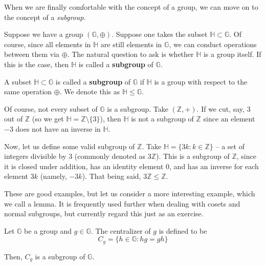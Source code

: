 \documentclass[../lecture-notes.tex]{subfiles}
\begin{document}
When we are finally comfortable with the concept of a group, we can move on to the concept of a \textit{subgroup}. 

Suppose we have a group $(\mathbb{G},\oplus)$. Suppose one takes the subset $\mathbb{H} \subset \mathbb{G}$. Of course, since all elements in $\mathbb{H}$ are still elements in $\mathbb{G}$, we can conduct operations between them via $\oplus$. 
The natural question to ask is whether $\mathbb{H}$ is a group itself. If this 
is the case, then $\mathbb{H}$ is called a \textbf{subgroup} of $\mathbb{G}$.

\begin{definition}
    A subset $\mathbb{H} \subset \mathbb{G}$ is called a \textbf{subgroup} of $\mathbb{G}$ if $\mathbb{H}$ is a group with respect to the same operation $\oplus$. We denote this as $\mathbb{H} \leq \mathbb{G}$.
\end{definition}

\begin{example}
    Of course, not every subset of $\mathbb{G}$ is a subgroup. Take $(\mathbb{Z}, +)$. If we cut, say, $3$ out of $\mathbb{Z}$ (so we get $\mathbb{H} = \mathbb{Z} \setminus \{3\}$), then $\mathbb{H}$ is not a subgroup of $\mathbb{Z}$ since an element $-3$ does not have an inverse in $\mathbb{H}$.
\end{example}

\begin{example}
    Now, let us define some valid subgroup of $\mathbb{Z}$. Take $\mathbb{H} = \{3k: k \in \mathbb{Z}\}$ -- a set of integers divisible by $3$ (commonly denoted as $3\mathbb{Z}$). This is a subgroup of $\mathbb{Z}$, since it is closed under addition, has an identity element $0$, and has an inverse for each element $3k$ (namely, $-3k$). That being said, $3\mathbb{Z} \leq \mathbb{Z}$.
\end{example}

These are good examples, but let us consider a more interesting example, which we call a lemma. It is frequently used further when dealing with cosets and normal subgroups, but currently regard this just as an exercise.
\begin{lemma}
    Let $\mathbb{G}$ be a group and $g \in \mathbb{G}$. The centralizer of $g$ is defined to be
    \begin{equation}
        C_g = \{h \in \mathbb{G}: h g = g h\}
    \end{equation}

    Then, $C_g$ is a subgroup of $\mathbb{G}$.
\end{lemma}
\end{document}
